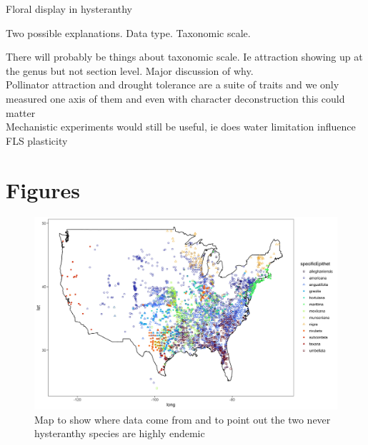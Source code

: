 \documentclass{article}\usepackage[]{graphicx}\usepackage[]{color}
\begin{document}
\secction Floral display in hysteranthy 

Two possible explanations. Data type. Taxonomic scale. 

There will probably be things about taxonomic scale. Ie attraction showing up at the genus but not section level. Major discussion of why. \\
Pollinator attraction and drought tolerance are a suite of traits and we only measured one axis of them and even with character deconstruction this could matter\\
Mechanistic experiments would still be useful, ie does water limitation influence FLS plasticity
\newpage
\section*{Figures}
    \begin{figure}[h!]
    \centering
 \includegraphics[width=\textwidth]{..//..//Plots/map.jpeg}
    \caption{Map to show where data come from and to point out the two never hysteranthy species are highly endemic}
    \label{fig:mappy}
\end{figure}
\end{document}
